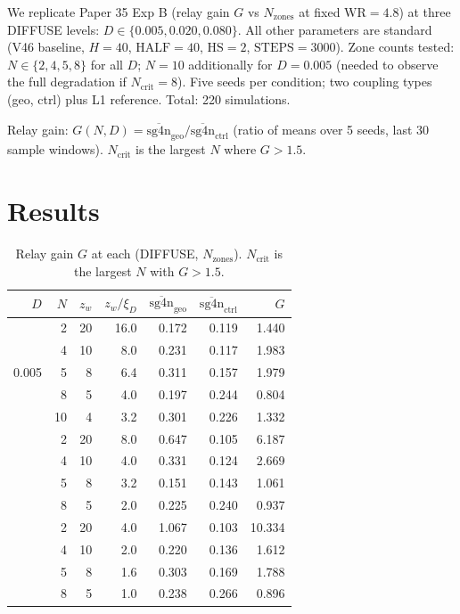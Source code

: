 \documentclass[11pt]{article}
\begin{document}
We replicate Paper 35 Exp B (relay gain $G$ vs $N_{\mathrm{zones}}$ at fixed
$\mathrm{WR} = 4.8$) at three DIFFUSE levels: $D \in \{0.005, 0.020, 0.080\}$.
All other parameters are standard (V46 baseline, $H=40$, $\mathrm{HALF}=40$,
$\mathrm{HS}=2$, $\mathrm{STEPS}=3000$). Zone counts tested:
$N \in \{2, 4, 5, 8\}$ for all $D$; $N=10$ additionally for $D=0.005$
(needed to observe the full degradation if $N_{\mathrm{crit}}=8$).
Five seeds per condition; two coupling types (geo, ctrl) plus L1 reference.
Total: 220 simulations.

Relay gain: $G(N, D) = \overline{\mathrm{sg4n}}_{\mathrm{geo}} /
\overline{\mathrm{sg4n}}_{\mathrm{ctrl}}$ (ratio of means over 5 seeds, last 30 sample
windows). $N_{\mathrm{crit}}$ is the largest $N$ where $G > 1.5$.

\section{Results}

\begin{table}[h]
\centering
\caption{Relay gain $G$ at each (DIFFUSE, $N_{\mathrm{zones}}$). $N_{\mathrm{crit}}$ is
  the largest $N$ with $G > 1.5$.}
\label{tab:results}
\begin{tabular}{rrrrrrr}
\toprule
$D$ & $N$ & $z_w$ & $z_w/\xi_D$ & $\overline{\mathrm{sg4n}}_{\mathrm{geo}}$ &
  $\overline{\mathrm{sg4n}}_{\mathrm{ctrl}}$ & $G$ \\
\midrule
\multirow{5}{*}{0.005} & 2  & 20 & 16.0 & 0.172 & 0.119 & 1.440 \\
                       & 4  & 10 &  8.0 & 0.231 & 0.117 & 1.983 \\
                       & 5  &  8 &  6.4 & 0.311 & 0.157 & 1.979 \\
                       & 8  &  5 &  4.0 & 0.197 & 0.244 & 0.804 \\
                       & 10 &  4 &  3.2 & 0.301 & 0.226 & 1.332 \\
\addlinespace
\multirow{4}{*}{0.020} & 2  & 20 &  8.0 & 0.647 & 0.105 & 6.187 \\
                       & 4  & 10 &  4.0 & 0.331 & 0.124 & 2.669 \\
                       & 5  &  8 &  3.2 & 0.151 & 0.143 & 1.061 \\
                       & 8  &  5 &  2.0 & 0.225 & 0.240 & 0.937 \\
\addlinespace
\multirow{4}{*}{0.080} & 2  & 20 &  4.0 & 1.067 & 0.103 & 10.334 \\
                       & 4  & 10 &  2.0 & 0.220 & 0.136 &  1.612 \\
                       & 5  &  8 &  1.6 & 0.303 & 0.169 &  1.788 \\
                       & 8  &  5 &  1.0 & 0.238 & 0.266 &  0.896 \\
\bottomrule
\end{tabular}
\end{table}
\end{document}
